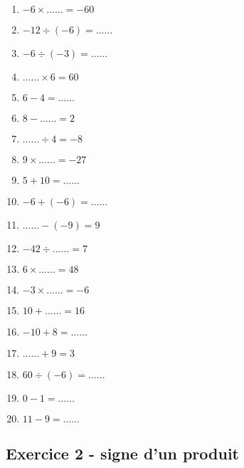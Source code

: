 \begin{multicols}{3}\noindent
    \begin{enumerate}
        \item $-6 \times \ldots\ldots = -60$
        \item $-12 \div \left( -6\right) = \ldots\ldots$
        \item $-6 \div \left( -3\right) = \ldots\ldots$
        \item $\ldots\ldots \times 6 = 60$
        \item $6 - 4 = \ldots\ldots$
        \item $8 - \ldots\ldots = 2$
        \item $\ldots\ldots \div 4 = -8$
        \item $9 \times \ldots\ldots = -27$
        \item $5 + 10 = \ldots\ldots$
        \item $-6 + \left( -6\right) = \ldots\ldots$
        \item $\ldots\ldots - \left( -9\right) = 9$
        \item $-42 \div \ldots\ldots = 7$
        \item $6 \times \ldots\ldots = 48$
        \item $-3 \times \ldots\ldots = -6$
        \item $10 + \ldots\ldots = 16$
        \item $-10 + 8 = \ldots\ldots$
        \item $\ldots\ldots + 9 = 3$
        \item $60 \div \left( -6\right) = \ldots\ldots$
        \item $0 - 1 = \ldots\ldots$
        \item $11 - 9 = \ldots\ldots$
    \end{enumerate}
  \end{multicols}

\subsection*{Exercice 2 - signe d'un produit}

